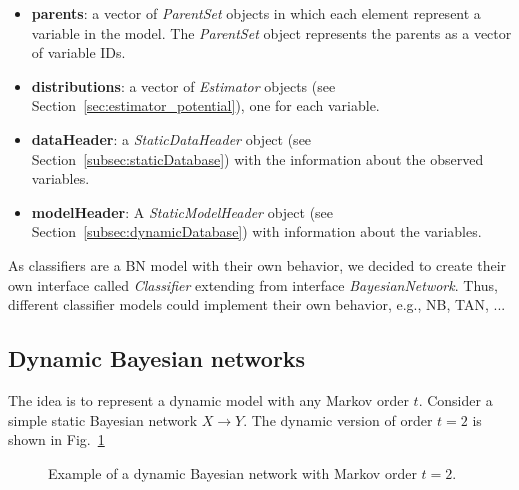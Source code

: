 \documentclass[a4paper,12pt]{article}
\begin{document}
\begin{itemize}
\item {\bf parents}: a vector of \emph{ParentSet} objects in which each element represent a 
variable in the model. The \emph{ParentSet} object represents the parents as a 
vector of variable IDs. 
\item {\bf distributions}: a vector of \emph{Estimator} objects (see Section~\ref{sec:estimator_potential}), one 
for each variable. 
\item {\bf dataHeader}: a \emph{StaticDataHeader} object (see Section~\ref{subsec:staticDatabase}) with 
the information about the observed variables. 
\item {\bf modelHeader}: A \emph{StaticModelHeader} object (see Section~\ref{subsec:dynamicDatabase}) 
with information about the variables.

\end{itemize}

As classifiers are a BN model with their own behavior, we decided to create their 
own interface called \emph{Classifier} extending from interface 
\emph{BayesianNetwork}. Thus, different classifier models could implement their 
own behavior, e.g., NB, TAN, ...






\subsection{Dynamic Bayesian networks}
\label{subsec:dynamicBNs}

The idea is to represent a dynamic model with any Markov order $t$. Consider a simple 
static Bayesian network $X \rightarrow Y$. The dynamic version of order $t=2$ 
is shown in Fig.~\ref{fig:dynamicBN}

\begin{figure}[h]

\centering
{}
\caption{Example of a dynamic Bayesian network with Markov order $t=2$.}
\label{fig:dynamicBN}
\end{figure}
\end{document}
